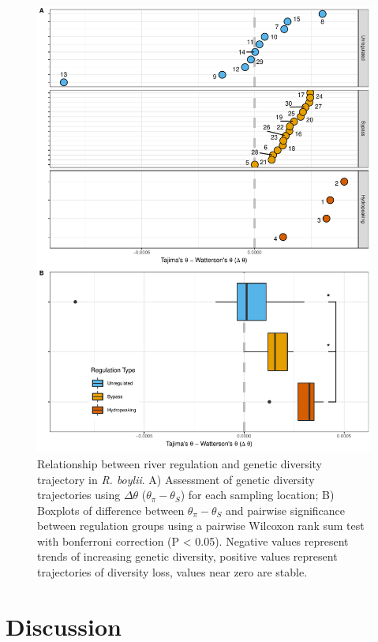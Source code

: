 \documentclass[proquest,12pt,final]{ucthesis-CA2012} %
\begin{document}
\begin{ucmainmatter}
\begin{figure}
\includegraphics[height=0.8\textheight,scale=1.1]{figure/ch1/fig_04ab_theta_combined_for_phd} \caption{Relationship between river regulation and genetic
diversity trajectory in \emph{R. boylii}. A) Assessment of genetic
diversity trajectories using \(\Delta\theta\)
(\(\theta_\pi - \theta_S\)) for each sampling location; B) Boxplots of
difference between \(\theta_\pi - \theta_S\) and pairwise significance
between regulation groups using a pairwise Wilcoxon rank sum test with
bonferroni correction (P \textless{} 0.05). Negative values represent
trends of increasing genetic diversity, positive values represent
trajectories of diversity loss, values near zero are stable.}\label{fig:CH1F4theta}
\end{figure}
\clearpage

\hypertarget{discussion}{%
\section{Discussion}\label{discussion}}


\end{ucmainmatter}
\end{document}
